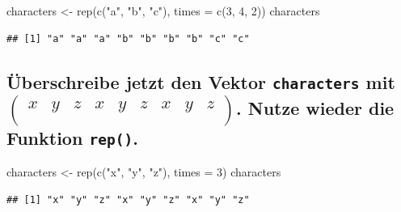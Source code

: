 \documentclass[12pt,a4paper]{article}
\newenvironment{Shaded}{\begin{snugshade}}{\end{snugshade}}
\newcommand{\AttributeTok}[1]{\textcolor[rgb]{0.77,0.63,0.00}{#1}}
\newcommand{\DecValTok}[1]{\textcolor[rgb]{0.00,0.00,0.81}{#1}}
\newcommand{\FunctionTok}[1]{\textcolor[rgb]{0.00,0.00,0.00}{#1}}
\newcommand{\NormalTok}[1]{#1}
\newcommand{\OtherTok}[1]{\textcolor[rgb]{0.56,0.35,0.01}{#1}}
\newcommand{\StringTok}[1]{\textcolor[rgb]{0.31,0.60,0.02}{#1}}
\begin{document}
\begin{Shaded}
\begin{Highlighting}[]
\NormalTok{    characters }\OtherTok{\textless{}{-}} \FunctionTok{rep}\NormalTok{(}\FunctionTok{c}\NormalTok{(}\StringTok{"a"}\NormalTok{, }\StringTok{"b"}\NormalTok{, }\StringTok{"c"}\NormalTok{), }\AttributeTok{times =} \FunctionTok{c}\NormalTok{(}\DecValTok{3}\NormalTok{, }\DecValTok{4}\NormalTok{, }\DecValTok{2}\NormalTok{))}
\NormalTok{    characters}
\end{Highlighting}
\end{Shaded}

\begin{verbatim}
## [1] "a" "a" "a" "b" "b" "b" "b" "c" "c"
\end{verbatim}

\vspace{0.5cm}

\hypertarget{uxfcberschreibe-jetzt-den-vektor-mit-beginpmatrix-x-y-z-x-y-z-x-y-z-endpmatrix.-nutze-wieder-die-funktion-.}{%
\subsection{\texorpdfstring{Überschreibe jetzt den Vektor
\texttt{characters} mit
\linebreak \(\begin{pmatrix} x & y & z & x & y & z & x & y & z \\ \end{pmatrix}\).
Nutze wieder die Funktion
\texttt{rep()}.}{Überschreibe jetzt den Vektor  mit \textbackslash begin\{pmatrix\} x \& y \& z \& x \& y \& z \& x \& y \& z \textbackslash\textbackslash{} \textbackslash end\{pmatrix\}. Nutze wieder die Funktion .}}\label{uxfcberschreibe-jetzt-den-vektor-mit-beginpmatrix-x-y-z-x-y-z-x-y-z-endpmatrix.-nutze-wieder-die-funktion-.}}

\begin{Shaded}
\begin{Highlighting}[]
\NormalTok{    characters }\OtherTok{\textless{}{-}} \FunctionTok{rep}\NormalTok{(}\FunctionTok{c}\NormalTok{(}\StringTok{"x"}\NormalTok{, }\StringTok{"y"}\NormalTok{, }\StringTok{"z"}\NormalTok{), }\AttributeTok{times =} \DecValTok{3}\NormalTok{)}
\NormalTok{    characters}
\end{Highlighting}
\end{Shaded}

\begin{verbatim}
## [1] "x" "y" "z" "x" "y" "z" "x" "y" "z"
\end{verbatim}
\end{document}
